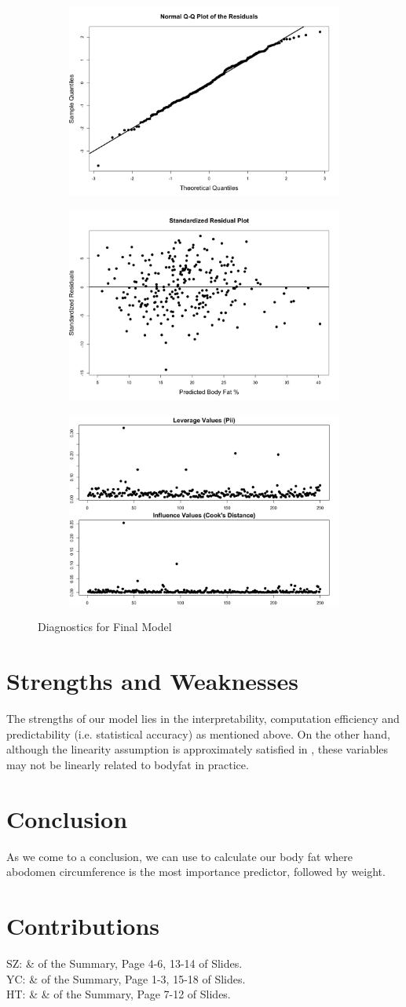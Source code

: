 \documentclass[11pt, letterpaper]{article}
\begin{document}
\begin{figure}
	\centering
	\begin{subfigure}
		\centering
		\includegraphics[width=.2\linewidth]{../Image/qq_plot.png}
	\end{subfigure}%
	\begin{subfigure}
		\centering
		\includegraphics[width=.2\linewidth]{../Image/Final_Model_Residual_Plot.png}
	\end{subfigure}
	\begin{subfigure}
	    \centering
	    \includegraphics[width=.2\linewidth]{../Image/Pii_Cook's_Distance.png}
    \end{subfigure}
	\caption{Diagnostics for Final Model}
	\label{fig:2}
\end{figure}

\section{Strengths and Weaknesses}
\label{sec:str}
The strengths of our model lies in the interpretability, computation efficiency and predictability (i.e. statistical accuracy) as mentioned above. On the other hand, although the linearity assumption is approximately satisfied in , these variables may not be linearly related to bodyfat in practice. 

\section{Conclusion}
\label{sec:con}
As we come to a conclusion, we can use  to calculate our body fat where abodomen circumference is the most importance predictor, followed by weight. 

\section{Contributions}
\noindent SZ:  \&  of the Summary, Page 4-6, 13-14 of Slides.\\
YC:  \&  of the Summary, Page 1-3, 15-18 of Slides.\\
HT:  \&  \&  of the Summary, Page 7-12 of Slides.\\
\end{document}
